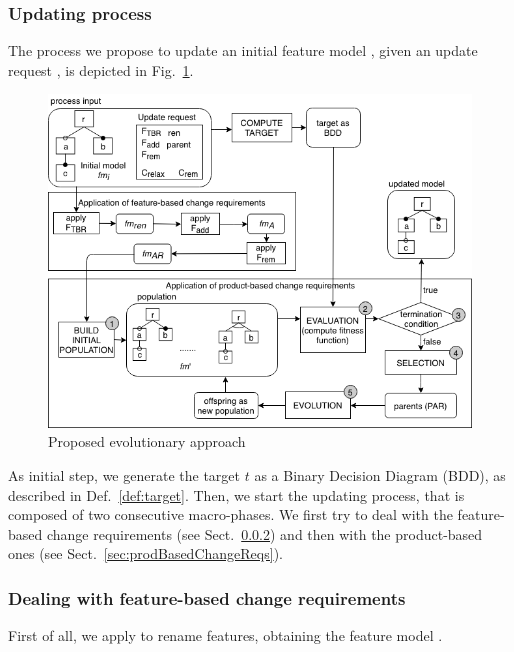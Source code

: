 \begin{tikzborder}{\cite{Gargantini16:validation}}
\begin{tikzborder}{\cite{gargantini_combinatorial_2017}}
\begin{tikzborder}{\cite{gargantini_combinatorial_2017}}
\begin{tikzborder}{\cite{garn2019}}
\begin{tikzborder}{\cite{arcaini2019achieving}}
	\subsubsection{Updating process}\label{sec:updatingProcess}
	
	\bb
	The process we propose to update an initial feature model \initFm, given an update request \UR, is depicted in Fig.~\ref{fig:approach}.
	\be
	
	\begin{figure}[h]
		\centering
		\includegraphics[width=\textwidth]{evolutionaryApproach}
		\caption{Proposed evolutionary approach}
		\label{fig:approach}
	\end{figure}
	
	\bb
	As initial step, we generate the target $t$ as a Binary Decision Diagram (BDD), as described in Def.~\ref{def:target}. Then, we start the updating process, that is composed of two consecutive macro-phases. We first try to deal with the feature-based change requirements (see Sect.~\ref{sec:featBasedChangeReqs}) and then with the product-based ones (see Sect.~\ref{sec:prodBasedChangeReqs}).
	\be
	
	\subsubsection{Dealing with feature-based change requirements}\label{sec:featBasedChangeReqs}
	
	\bb 
	First of all, we apply \Ftbr to rename features, obtaining the feature model \fmrenamed.
	

\end{tikzborder}
\end{tikzborder}
\end{tikzborder}
\end{tikzborder}
\end{tikzborder}
